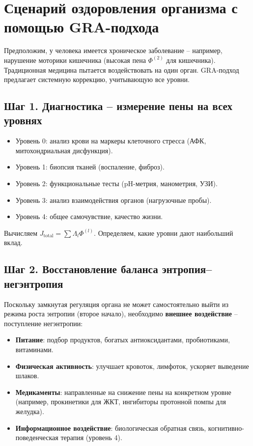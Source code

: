 \documentclass[12pt,a4paper]{article}
\begin{document}
\section{Сценарий оздоровления организма с помощью GRA-подхода}

Предположим, у человека имеется хроническое заболевание – например, нарушение моторики кишечника (высокая пена \(\Phi^{(2)}\) для кишечника). Традиционная медицина пытается воздействовать на один орган. GRA-подход предлагает системную коррекцию, учитывающую все уровни.

\subsection{Шаг 1. Диагностика – измерение пены на всех уровнях}
\begin{itemize}
    \item Уровень 0: анализ крови на маркеры клеточного стресса (АФК, митохондриальная дисфункция).
    \item Уровень 1: биопсия тканей (воспаление, фиброз).
    \item Уровень 2: функциональные тесты (pH-метрия, манометрия, УЗИ).
    \item Уровень 3: анализ взаимодействия органов (нагрузочные пробы).
    \item Уровень 4: общее самочувствие, качество жизни.
\end{itemize}
Вычисляем \(J_{\text{total}} = \sum \Lambda_l \Phi^{(l)}\). Определяем, какие уровни дают наибольший вклад.

\subsection{Шаг 2. Восстановление баланса энтропия–негэнтропия}
Поскольку замкнутая регуляция органа не может самостоятельно выйти из режима роста энтропии (второе начало), необходимо \textbf{внешнее воздействие} – поступление негэнтропии:
\begin{itemize}
    \item \textbf{Питание}: подбор продуктов, богатых антиоксидантами, пробиотиками, витаминами.
    \item \textbf{Физическая активность}: улучшает кровоток, лимфоток, ускоряет выведение шлаков.
    \item \textbf{Медикаменты}: направленные на снижение пены на конкретном уровне (например, прокинетики для ЖКТ, ингибиторы протонной помпы для желудка).
    \item \textbf{Информационное воздействие}: биологическая обратная связь, когнитивно-поведенческая терапия (уровень 4).
\end{itemize}
\end{document}
